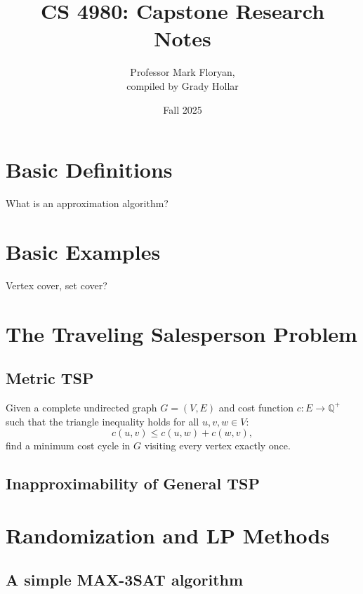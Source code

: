 \documentclass{article}
\title{CS 4980: Capstone Research\\
        Notes}
\author{Professor Mark Floryan,\\
        compiled by Grady Hollar}
\date{Fall 2025}
\newcommand{\Q}{\mathbb{Q}}
\newenvironment{envsection}[1]{\begin{trivlist}
\item[\hskip \labelsep {\bfseries #1}]}{\end{trivlist}}
\begin{document}
\setlength{\abovedisplayskip}{4pt}
\setlength{\belowdisplayskip}{4pt}
\maketitle



\section{Basic Definitions}

What is an approximation algorithm?

\section{Basic Examples}


Vertex cover, set cover?



\section{The Traveling Salesperson Problem}

\subsection{Metric TSP}

\begin{envsection}{Optimization Problem (Metric-TSP)}
    Given a complete undirected graph $G = (V,E)$ and cost function $c: E \to \Q^+$ such that the triangle inequality holds for all $u,v,w \in V$:
    \[
    c(u,v) \leq c(u,w) + c(w,v),
    \]
    find a minimum cost cycle in $G$ visiting every vertex exactly once.
\end{envsection}

\subsection{Inapproximability of General TSP}

\section{Randomization and LP Methods}

\subsection{A simple MAX-3SAT algorithm}
\end{document}
